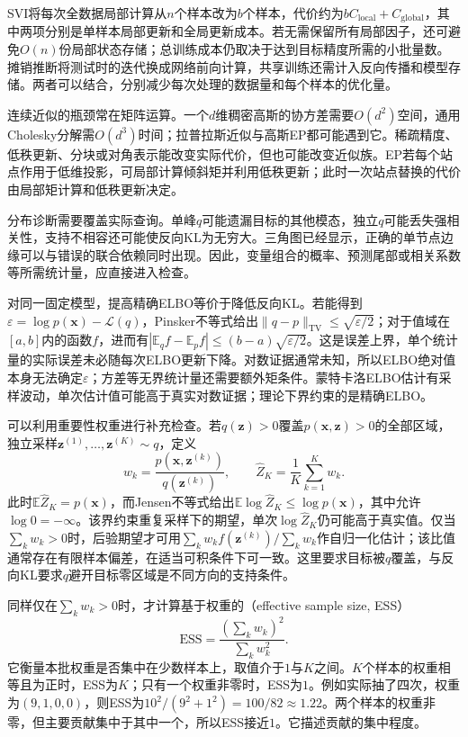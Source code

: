 SVI将每次全数据局部计算从$n$个样本改为$b$个样本，代价约为$bC_{\mathrm{local}}+C_{\mathrm{global}}$，其中两项分别是单样本局部更新和全局更新成本。若无需保留所有局部因子，还可避免$O(n)$份局部状态存储；总训练成本仍取决于达到目标精度所需的小批量数。摊销推断将测试时的迭代换成网络前向计算，共享训练还需计入反向传播和模型存储。两者可以结合，分别减少每次处理的数据量和每个样本的优化量。

连续近似的瓶颈常在矩阵运算。一个$d$维稠密高斯的协方差需要$O(d^2)$空间，通用Cholesky分解需$O(d^3)$时间；拉普拉斯近似与高斯EP都可能遇到它。稀疏精度、低秩更新、分块或对角表示能改变实际代价，但也可能改变近似族。EP若每个站点作用于低维投影，可局部计算倾斜矩并利用低秩更新；此时一次站点替换的代价由局部矩计算和低秩更新决定。

分布诊断需要覆盖实际查询。单峰$q$可能遗漏目标的其他模态，独立$q$可能丢失强相关性，支持不相容还可能使反向KL为无穷大。三角图已经显示，正确的单节点边缘可以与错误的联合依赖同时出现。因此，变量组合的概率、预测尾部或相关系数等所需统计量，应直接进入检查。

对同一固定模型，提高精确ELBO等价于降低反向KL。若能得到$\varepsilon=\log p(\bm x)-\mathcal L(q)$，Pinsker不等式给出$\|q-p\|_{\mathrm{TV}}\leq\sqrt{\varepsilon/2}$；对于值域在$[a,b]$内的函数$f$，进而有$|\mathbb E_qf-\mathbb E_pf|\leq(b-a)\sqrt{\varepsilon/2}$。这是误差上界，单个统计量的实际误差未必随每次ELBO更新下降。对数证据通常未知，所以ELBO绝对值本身无法确定$\varepsilon$；方差等无界统计量还需要额外矩条件。蒙特卡洛ELBO估计有采样波动，单次估计值可能高于真实对数证据；理论下界约束的是精确ELBO。

可以利用重要性权重进行补充检查。若$q(\bm z)>0$覆盖$p(\bm x,\bm z)>0$的全部区域，独立采样$\bm z^{(1)},\ldots,\bm z^{(K)}\sim q$，定义
\begin{equation}
  w_k=\frac{p(\bm x,\bm z^{(k)})}{q(\bm z^{(k)})},
  \qquad
  \widehat Z_K=\frac1K\sum_{k=1}^K w_k.
  \label{eq:pgm-variational-importance}
\end{equation}
此时$\mathbb E\widehat Z_K=p(\bm x)$，而Jensen不等式给出$\mathbb E\log\widehat Z_K\leq\log p(\bm x)$，其中允许$\log0=-\infty$。该界约束重复采样下的期望，单次$\log\widehat Z_K$仍可能高于真实值。仅当$\sum_kw_k>0$时，后验期望才可用$\sum_kw_kf(\bm z^{(k)})/\sum_kw_k$作自归一化估计；该比值通常存在有限样本偏差，在适当可积条件下可一致。这里要求目标被$q$覆盖，与反向KL要求$q$避开目标零区域是不同方向的支持条件。

同样仅在$\sum_kw_k>0$时，才计算基于权重的（effective sample size, ESS）
\[
  \widehat{\mathrm{ESS}}
  =\frac{(\sum_kw_k)^2}{\sum_kw_k^2}.
\]
它衡量本批权重是否集中在少数样本上，取值介于$1$与$K$之间。$K$个样本的权重相等且为正时，ESS为$K$；只有一个权重非零时，ESS为$1$。例如实际抽了四次，权重为$(9,1,0,0)$，则ESS为$10^2/(9^2+1^2)=100/82\approx1.22$。两个样本的权重非零，但主要贡献集中于其中一个，所以ESS接近$1$。它描述贡献的集中程度。

